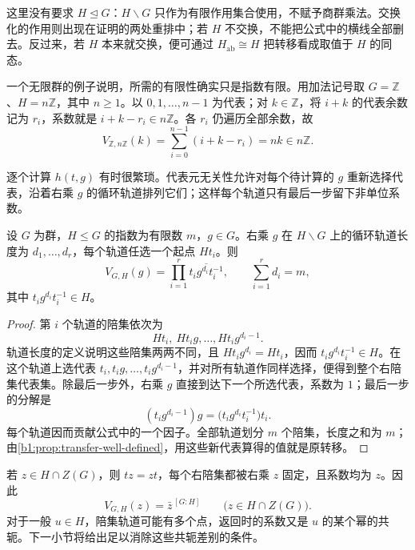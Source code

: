 这里没有要求 \(H\trianglelefteq G\)：\(H\backslash G\) 只作为有限作用集合使用，不赋予商群乘法。交换化的作用则出现在证明的两处重排中；若 \(H\) 不交换，不能把公式中的横线全部删去。反过来，若 \(H\) 本来就交换，便可通过 \(H_{\mathrm{ab}}\cong H\) 把转移看成取值于 \(H\) 的同态。

\ProseParagraphBreak
一个无限群的例子说明，所需的有限性确实只是指数有限。用加法记号取 \(G=\mathbb Z\)、\(H=n\mathbb Z\)，其中 \(n\geq1\)。以 \(0,1,\ldots,n-1\) 为代表；对 \(k\in\mathbb Z\)，将 \(i+k\) 的代表余数记为 \(r_i\)，系数就是 \(i+k-r_i\in n\mathbb Z\)。各 \(r_i\) 仍遍历全部余数，故
\[
	V_{\mathbb Z,n\mathbb Z}(k)
	=\sum_{i=0}^{n-1}(i+k-r_i)=nk\in n\mathbb Z.
\]

\ProseParagraphBreak
逐个计算 \(h(t,g)\) 有时很繁琐。代表元无关性允许对每个待计算的 \(g\) 重新选择代表，沿着右乘 \(g\) 的循环轨道排列它们；这样每个轨道只有最后一步留下非单位系数。

\begin{lemma}[转移的轨道公式]\label{b1:lem:transfer-orbit-formula}
	设 \(G\) 为群，\(H\leq G\) 的指数为有限数 \(m\)，\(g\in G\)。右乘 \(g\) 在 \(H\backslash G\) 上的循环轨道长度为 \(d_1,\ldots,d_r\)，每个轨道任选一个起点 \(Ht_i\)。则
	\begin{equation}\label{b1:eq:transfer-orbit-formula}
		V_{G,H}(g)=\prod_{i=1}^r
		\overline{t_i g^{d_i}t_i^{-1}},\qquad
		\sum_{i=1}^r d_i=m,
	\end{equation}
	其中 \(t_i g^{d_i}t_i^{-1}\in H\)。
\end{lemma}

\begin{proof}
	第 \(i\) 个轨道的陪集依次为
	\[
		Ht_i,\ Ht_ig,\ldots,Ht_ig^{d_i-1}.
	\]
	轨道长度的定义说明这些陪集两两不同，且 \(Ht_ig^{d_i}=Ht_i\)，因而 \(t_i g^{d_i}t_i^{-1}\in H\)。在这个轨道上选代表 \(t_i,t_ig,\ldots,t_ig^{d_i-1}\)，并对所有轨道作同样选择，便得到整个右陪集代表集。除最后一步外，右乘 \(g\) 直接到达下一个所选代表，系数为 \(1\)；最后一步的分解是
	\[
		(t_i g^{d_i-1})g
		=\bigl(t_i g^{d_i}t_i^{-1}\bigr)t_i.
	\]
	每个轨道因而贡献公式中的一个因子。全部轨道划分 \(m\) 个陪集，长度之和为 \(m\)；由\cref{b1:prop:transfer-well-defined}，用这些新代表算得的值就是原转移。
\end{proof}

若 \(z\in H\cap Z(G)\)，则 \(tz=zt\)，每个右陪集都被右乘 \(z\) 固定，且系数均为 \(z\)。因此
\begin{equation}\label{b1:eq:transfer-central-element}
	V_{G,H}(z)=\bar z^{\,[G:H]}
	\qquad\bigl(z\in H\cap Z(G)\bigr).
\end{equation}
对于一般 \(u\in H\)，陪集轨道可能有多个点，返回时的系数又是 \(u\) 的某个幂的共轭。下一小节将给出足以消除这些共轭差别的条件。

